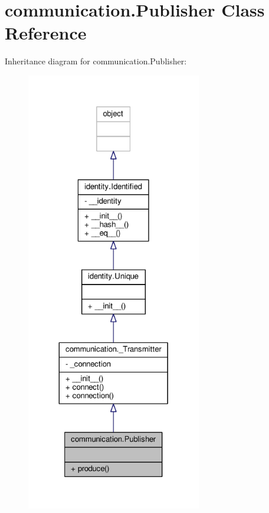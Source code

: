 \hypertarget{classcommunication_1_1Publisher}{}\section{communication.\+Publisher Class Reference}
\label{classcommunication_1_1Publisher}


Inheritance diagram for communication.\+Publisher\+:\nopagebreak
\begin{figure}[H]
\begin{center}
\leavevmode
\includegraphics[height=550pt]{classcommunication_1_1Publisher__inherit__graph}
\end{center}
\end{figure}



